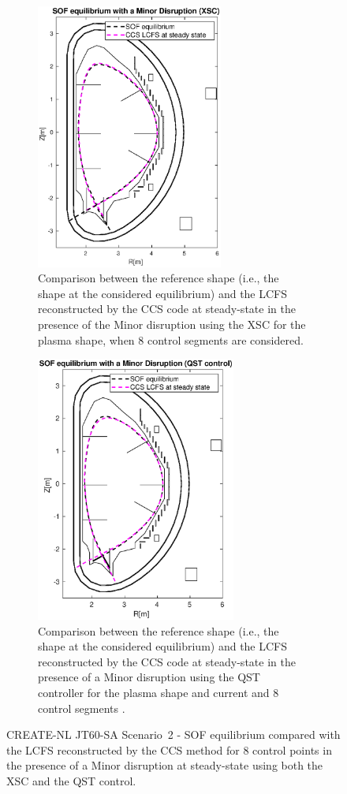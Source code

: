 \begin{figure}[h]
	\centering
		\begin{subfigure}[b]{0.32\textwidth}
		\includegraphics[height=8.75cm] {Chp3/Results_iso/8_gaps_mnr_disrp_equilVsLCFS.eps}  
		\caption{Comparison between the reference shape (i.e., the shape at the considered equilibrium) and the LCFS reconstructed by the  CCS code at steady-state in the presence of the Minor disruption  using the XSC for the plasma shape, when 8 control segments are considered.
		\label{XSC_isoflux_ss} }
			\end{subfigure}
	\hspace{2 cm}
				\begin{subfigure}[b]{0.32\textwidth}
			\includegraphics[height=8.75cm] {Chp3/Results_iso/8_gaps_mnr_disrp_equilVsLCFS_FBC.eps}  
			\caption{Comparison between the reference shape (i.e., the shape at the considered equilibrium) and the LCFS reconstructed by the CCS code at steady-state in the presence of a Minor disruption using the QST controller for the plasma shape and current and 8 control segments . 
				\label{FBS_isoflux_ss} }
		\end{subfigure}
		

\caption{ CREATE-NL JT60-SA Scenario~2 - SOF equilibrium compared with the LCFS reconstructed by the CCS method for 8 control points in the presence of a Minor disruption at steady-state using both the XSC and the QST control.  \label{compFBC_XSC_ss}}
\end{figure}




